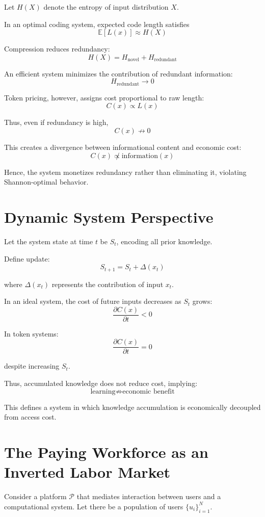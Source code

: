 \documentclass[12pt, oneside]{article}
\begin{document}
Let $H(X)$ denote the entropy of input distribution $X$.

In an optimal coding system, expected code length satisfies
\[
\mathbb{E}[L(x)] \approx H(X)
\]

Compression reduces redundancy:
\[
H(X) = H_{\text{novel}} + H_{\text{redundant}}
\]

An efficient system minimizes the contribution of redundant information:
\[
H_{\text{redundant}} \to 0
\]

Token pricing, however, assigns cost proportional to raw length:
\[
C(x) \propto L(x)
\]

Thus, even if redundancy is high,
\[
C(x) \not\to 0
\]

This creates a divergence between informational content and economic cost:
\[
C(x) \not\propto \text{information}(x)
\]

Hence, the system monetizes redundancy rather than eliminating it, violating Shannon-optimal behavior.

\section{Dynamic System Perspective}

Let the system state at time $t$ be $S_t$, encoding all prior knowledge.

Define update:
\[
S_{t+1} = S_t + \Delta(x_t)
\]

where $\Delta(x_t)$ represents the contribution of input $x_t$.

In an ideal system, the cost of future inputs decreases as $S_t$ grows:
\[
\frac{\partial C(x)}{\partial t} < 0
\]

In token systems:
\[
\frac{\partial C(x)}{\partial t} = 0
\]

despite increasing $S_t$.

Thus, accumulated knowledge does not reduce cost, implying:
\[
\text{learning} \not\Rightarrow \text{economic benefit}
\]

This defines a system in which knowledge accumulation is economically decoupled from access cost.

\section{The Paying Workforce as an Inverted Labor Market}

Consider a platform $\mathcal{P}$ that mediates interaction between users and a computational system. Let there be a population of users $\{u_i\}_{i=1}^N$.
\end{document}
